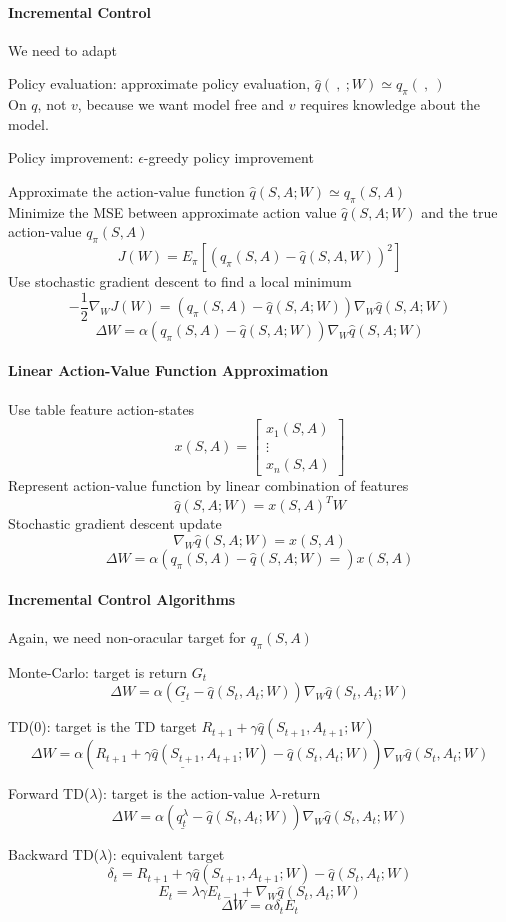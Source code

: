 \documentclass[10pt]{report}
\begin{document}
\paragraph{Incremental Control}
We need to adapt
\begin{list}{}{}
	\item Policy evaluation: approximate policy evaluation, $\hat{q}(\:,\:;W)\simeq q_\pi(\:,\:)$\\
	On $q$, not $v$, because we want model free and $v$ requires knowledge about the model.
	\item Policy improvement: $\epsilon$-greedy policy improvement
\end{list}
Approximate the action-value function $\hat{q}(S,A;W)\simeq q_\pi(S,A)$\\
Minimize the MSE between approximate action value $\hat{q}(S,A;W)$ and the true action-value $q_\pi(S,A)$
$$J(W) = E_\pi[(q_\pi(S,A)-\hat{q}(S,A,W))^2]$$
Use stochastic gradient descent to find a local minimum
$$-\frac{1}{2}\nabla_W J(W) = (q_\pi(S,A) - \hat{q}(S,A;W))\nabla_W\hat{q}(S,A;W)$$
$$\Delta W=\alpha(q_\pi(S,A) - \hat{q}(S,A;W))\nabla_W\hat{q}(S,A;W)$$
\paragraph{Linear Action-Value Function Approximation} Use table feature action-states 
$$x(S,A) = \left[\begin{array}{c}
x_1(S,A)\\\vdots\\x_n(S,A)
\end{array}\right]$$
Represent action-value function by linear combination of features
$$\hat{q}(S,A;W) = x(S,A)^TW$$
Stochastic gradient descent update
$$\nabla_W\hat{q}(S,A;W) = x(S,A)$$
$$\Delta W= \alpha(q_\pi(S,A)-\hat{q}(S,A;W)=)x(S,A)$$
\paragraph{Incremental Control Algorithms} Again, we need non-oracular target for $q_\pi(S,A)$
\begin{list}{}{}
	\item Monte-Carlo: target is return $G_t$
	$$\Delta W=\alpha(\underline{G_t} - \hat{q}(S_t,A_t;W))\nabla_W\hat{q}(S_t,A_t;W)$$
	\item TD(0): target is the TD target $R_{t+1}+\gamma\hat{q}(S_{t+1},A_{t+1};W)$
	$$\Delta W=\alpha(\underline{R_{t+1}+\gamma\hat{q}(S_{t+1},A_{t+1};W)} - \hat{q}(S_t,A_t;W))\nabla_W\hat{q}(S_t,A_t;W)$$
	\item Forward TD($\lambda$): target is the action-value $\lambda$-return
	$$\Delta W=\alpha(\underline{q_t^\lambda} - \hat{q}(S_t,A_t;W))\nabla_W\hat{q}(S_t,A_t;W)$$
	\item Backward TD($\lambda$): equivalent target
	$$\delta_t = R_{t+1} + \gamma\hat{q}(S_{t+1},A_{t+1};W)-\hat{q}(S_t,A_t;W)$$
	$$E_t=\lambda\gamma E_{t-1} + \nabla_W\hat{q}(S_t,A_t;W)$$
	$$\Delta W = \alpha\delta_t E_t$$
\end{list}
\end{document}
